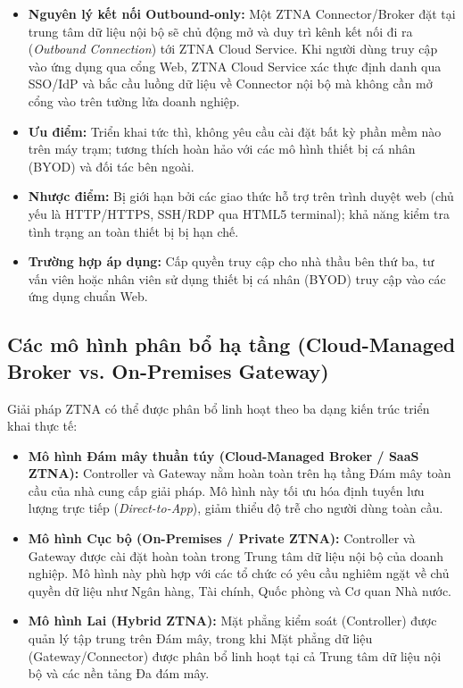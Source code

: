 \begin{itemize}
    \item \textbf{Nguyên lý kết nối Outbound-only:} Một ZTNA Connector/Broker đặt tại trung tâm dữ liệu nội bộ sẽ chủ động mở và duy trì kênh kết nối đi ra (\textit{Outbound Connection}) tới ZTNA Cloud Service. Khi người dùng truy cập vào ứng dụng qua cổng Web, ZTNA Cloud Service xác thực định danh qua SSO/IdP và bắc cầu luồng dữ liệu về Connector nội bộ mà không cần mở cổng vào trên tường lửa doanh nghiệp.
    \item \textbf{Ưu điểm:} Triển khai tức thì, không yêu cầu cài đặt bất kỳ phần mềm nào trên máy trạm; tương thích hoàn hảo với các mô hình thiết bị cá nhân (BYOD) và đối tác bên ngoài.
    \item \textbf{Nhược điểm:} Bị giới hạn bởi các giao thức hỗ trợ trên trình duyệt web (chủ yếu là HTTP/HTTPS, SSH/RDP qua HTML5 terminal); khả năng kiểm tra tình trạng an toàn thiết bị bị hạn chế.
    \item \textbf{Trường hợp áp dụng:} Cấp quyền truy cập cho nhà thầu bên thứ ba, tư vấn viên hoặc nhân viên sử dụng thiết bị cá nhân (BYOD) truy cập vào các ứng dụng chuẩn Web.
\end{itemize}

\subsection{Các mô hình phân bổ hạ tầng (Cloud-Managed Broker vs. On-Premises Gateway)}
\label{subsec:3_3_3}

Giải pháp ZTNA có thể được phân bổ linh hoạt theo ba dạng kiến trúc triển khai thực tế:

\begin{itemize}
    \item \textbf{Mô hình Đám mây thuần túy (Cloud-Managed Broker / SaaS ZTNA):} Controller và Gateway nằm hoàn toàn trên hạ tầng Đám mây toàn cầu của nhà cung cấp giải pháp. Mô hình này tối ưu hóa định tuyến lưu lượng trực tiếp (\textit{Direct-to-App}), giảm thiểu độ trễ cho người dùng toàn cầu.
    \item \textbf{Mô hình Cục bộ (On-Premises / Private ZTNA):} Controller và Gateway được cài đặt hoàn toàn trong Trung tâm dữ liệu nội bộ của doanh nghiệp. Mô hình này phù hợp với các tổ chức có yêu cầu nghiêm ngặt về chủ quyền dữ liệu như Ngân hàng, Tài chính, Quốc phòng và Cơ quan Nhà nước.
    \item \textbf{Mô hình Lai (Hybrid ZTNA):} Mặt phẳng kiểm soát (Controller) được quản lý tập trung trên Đám mây, trong khi Mặt phẳng dữ liệu (Gateway/Connector) được phân bổ linh hoạt tại cả Trung tâm dữ liệu nội bộ và các nền tảng Đa đám mây.
\end{itemize}

